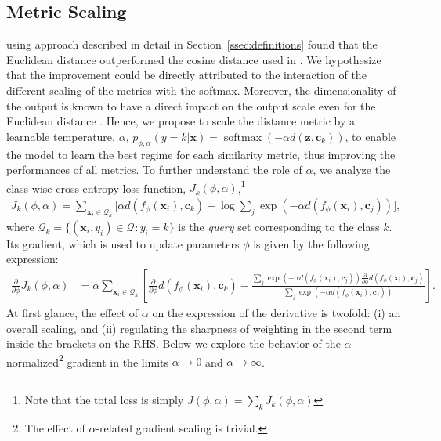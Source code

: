 \documentclass{article}
\renewcommand{\vec}[1]{\mathbf{#1}}
\newcommand{\query}[1]{\mathcal{Q}_{#1}}
\newcommand{\metric}{d}
\DeclareMathOperator{\softmax}{softmax}
\begin{document}
\subsection{Metric Scaling}\label{ssec:theory_metric_scaling}
\citet{snell2017prototypical} using approach described in detail in Section~\ref{ssec:definitions} found that the Euclidean distance outperformed the cosine distance used in \citet{vinyals2016matching}. We hypothesize that the improvement could be directly attributed to the interaction of the different scaling of the metrics with the softmax. Moreover, the dimensionality of the output is known to have a direct impact on the output scale even for the Euclidean distance \citep{vaswani2017attention}. Hence, we propose to scale the distance metric by a learnable temperature, $\alpha$, $p_{\phi,\alpha}(y=k|\vec{x})=\softmax(-\alpha d(\vec{z}, \mathbf{c}_k))$, to enable the model to learn the best regime for each similarity metric, thus improving the performances of all metrics. To further understand the role of $\alpha$, we analyze the class-wise cross-entropy loss function, $J_{k}(\phi,\alpha)$,\footnote{Note that the total loss is simply $J(\phi,\alpha) = \sum_{k} J_{k}(\phi,\alpha)$}
\begin{align} \label{eqn:softmax_with_alpha_cost_by_class}
    J_{k}(\phi,\alpha) = \sum_{\vec{x}_{i} \in \query{k}} \Big[ \alpha \metric(f_{\phi}(\vec{x}_{i}), \vec{c}_k)  + \log \sum_{j} \exp(-\alpha \metric(f_{\phi}(\vec{x}_i), \vec{c}_j)) \Big],
\end{align}
where $\query{k} = \{ (\vec{x}_i, y_i) \in \query{} : y_i = k \}$ is the \emph{query} set corresponding to the class $k$. Its gradient, which is used to update parameters $\phi$ is given by the following expression:
\begin{align} \label{eqn:softmax_with_alpha_total_derivative}
    \frac{\partial}{\partial\phi}J_k(\phi,\alpha) &= \alpha \sum_{\vec{x}_{i} \in \query{k}} \left[ \frac{\partial}{\partial\phi} \metric(f_{\phi}(\vec{x}_{i}), \vec{c}_k)  - \frac{\sum_{j} \exp(-\alpha \metric(f_{\phi}(\vec{x}_i), \vec{c}_j)) \frac{\partial}{\partial\phi} \metric(f_{\phi}(\vec{x}_{i}), \vec{c}_j)}{\sum_{j} \exp(-\alpha \metric(f_{\phi}(\vec{x}_i), \vec{c}_j))} \right].
\end{align}
At first glance, the effect of $\alpha$ on the expression of the derivative is twofold: (i) an overall scaling, and (ii) regulating the sharpness of weighting in the second term inside the brackets on the RHS. Below we explore the behavior of the $\alpha$-normalized\footnote{The effect of $\alpha$-related gradient scaling is trivial.}  gradient in the limits $\alpha \to 0$ and $\alpha \to \infty$. 
\end{document}
